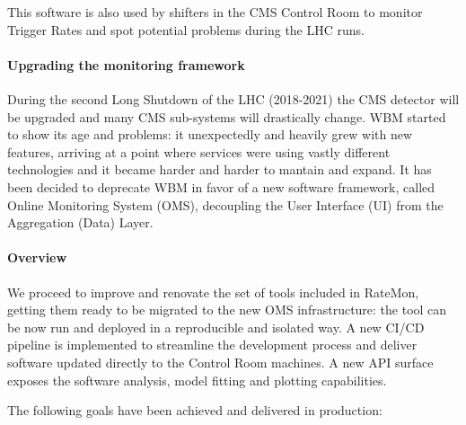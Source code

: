 \documentclass[a4, oneside, 10pt, nobib]{memoir}
\begin{document}
		This software is also used by shifters in the CMS Control Room to monitor Trigger Rates and spot potential problems during the LHC runs.

		\paragraph{Upgrading the monitoring framework} 

		During the second Long Shutdown of the LHC (2018-2021) the CMS detector will be upgraded and many CMS sub-systems will drastically change. WBM started to show its age and problems: it unexpectedly and heavily grew with new features, arriving at a point where services were using vastly different technologies and it became harder and harder to mantain and expand. It has been decided to deprecate WBM in favor of a new software framework, called Online Monitoring System (OMS), decoupling the User Interface (UI) from the Aggregation (Data) Layer.

		\paragraph{Overview}

		We proceed to improve and renovate the set of tools included in RateMon, getting them ready to be migrated to the new OMS infrastructure: the tool can be now run and deployed in a reproducible and isolated way. A new CI/CD pipeline is implemented to streamline the development process and deliver software updated directly to the Control Room machines. A new API surface exposes the software analysis, model fitting and plotting capabilities.

		The following goals have been achieved and delivered in production:
\end{document}
